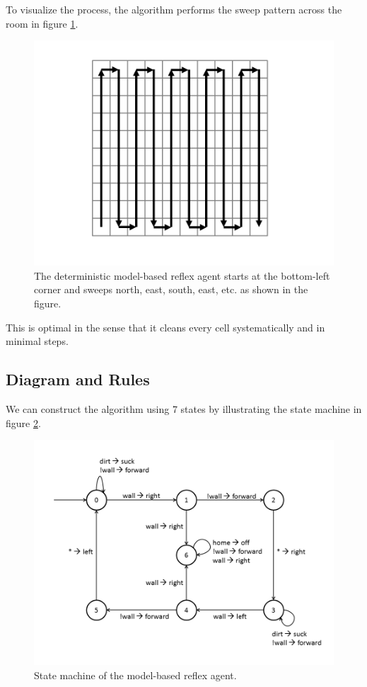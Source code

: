 To visualize the process, the algorithm performs the sweep pattern across the room in figure \ref{fig:motion}.

\begin{figure}[!t]
	\centering
	\includegraphics[scale=.30]{img/3-motion.png}
	\caption{The deterministic model-based reflex agent starts at the bottom-left corner and sweeps north, east, south, east, etc. as shown in the figure.}
	\label{fig:motion}
\end{figure}

This is optimal in the sense that it cleans every cell systematically and in minimal steps.

\subsection{Diagram and Rules}

We can construct the algorithm using 7 states by illustrating the state machine in figure \ref{fig:states}.

\begin{figure}[!t]
	\centering
	\includegraphics[scale=.30]{img/3-statediag.png}
	\caption{State machine of the model-based reflex agent.}
	\label{fig:states}
\end{figure}

